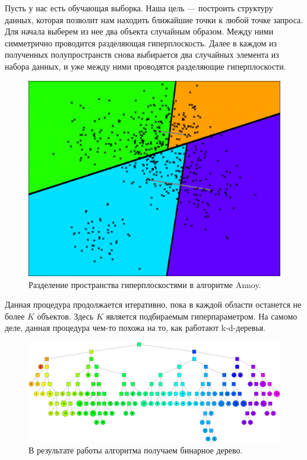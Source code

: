 Пусть у нас есть обучающая выборка. Наша цель — построить структуру данных, которая позволит нам находить ближайшие точки к любой точке запроса. Для начала выберем из нее два объекта случайным образом. Между ними симметрично проводится разделяющая гиперплоскость. Далее в каждом из полученных полупространств снова выбирается два случайных элемента из набора данных, и уже между ними проводятся разделяющие гиперплоскости.

\begin{figure}[h]
    \centering
    \includegraphics[width=\textwidth]{chapters/metric/images/tree-2.png}
    \caption{Разделение пространства гиперплоскостями в алгоритме Annoy.}
    \label{fig:annoy}
\end{figure}

Данная процедура продолжается итеративно, пока в каждой области останется не более $K$ объектов. Здесь $K$ является подбираемым гиперпараметром. На самомо деле, данная процедура чем-то похожа на то, как работают k-d-деревья.

\begin{figure}[h]
    \centering
    \includegraphics[width=\textwidth]{chapters/metric/images/tree-full.png}
    \caption{В результате работы алгоритма получаем бинарное дерево.}
    \label{fig:full-tree}
\end{figure}

